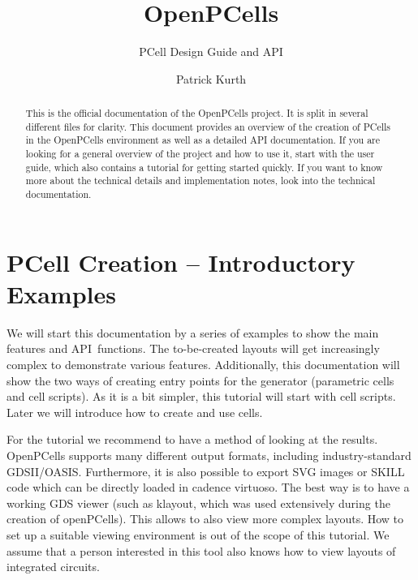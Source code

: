 

\title{OpenPCells}
\subtitle{PCell Design Guide and API}
\author{Patrick Kurth}


\maketitle
\begin{abstract}
    \noindent This is the official documentation of the OpenPCells project.
    It is split in several different files for clarity.
    This document provides an overview of the creation of PCells in the OpenPCells environment as well as a detailed API documentation.
    If you are looking for a general overview of the project and how to use it, start with the user guide, which also contains a tutorial for getting started quickly.
    If you want to know more about the technical details and implementation notes, look into the technical documentation.
\end{abstract}

\tableofcontents

\section{PCell Creation -- Introductory Examples}
We will start this documentation by a series of examples to show the main features and API~functions.
The to-be-created layouts will get increasingly complex to demonstrate various features.
Additionally, this documentation will show the two ways of creating entry points for the generator (parametric cells and cell scripts).
As it is a bit simpler, this tutorial will start with cell scripts.
Later we will introduce how to create and use cells.

For the tutorial we recommend to have a method of looking at the results.
OpenPCells supports many different output formats, including industry-standard GDSII/OASIS.
Furthermore, it is also possible to export SVG images or SKILL code which can be directly loaded in cadence virtuoso.
The best way is to have a working GDS viewer (such as klayout, which was used extensively during the creation of openPCells).
This allows to also view more complex layouts.
How to set up a suitable viewing environment is out of the scope of this tutorial.
We assume that a person interested in this tool also knows how to view layouts of integrated circuits.

